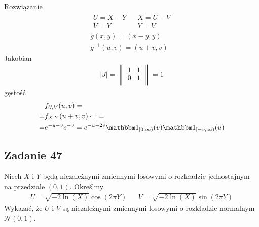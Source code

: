 Rozwiązanie
\begin{gather*}
\begin{array}{lll}
	U=X-Y &  & X=U+V \\
	V=Y   &  & Y=V
\end{array}\\
g(x,y)=(x-y,y)\\
g^{-1}(u,v)=(u+v,v)
\end{gather*}
Jakobian
\begin{gather*}
|J|=
\begin{Vmatrix}
 1 & 1 \\
 0 & 1 \\
\end{Vmatrix}=1
\end{gather*}
gęstość
\begin{align*}
&f_{U,V}(u,v)
=\\=&
f_{X,Y}(u+v,v)\cdot 1
=\\=&
e^{-u-v}e^{-v}=
e^{-u-2v}\mathbbm1_{[0,\infty )}(v)\mathbbm1_{[-v,\infty )}(u)
\end{align*}


\subsection*{Zadanie 47}
Niech $ X $ i $ Y $ będą niezależnymi zmiennymi losowymi o rozkładzie jednostajnym na przedziale $ (0,1) $. Określmy
\begin{align*}
U=\sqrt{-2\ln(X)}\cos(2\pi Y)
&&
V=\sqrt{-2\ln(X)}\sin(2\pi Y)
\end{align*}
Wykazać, że $ U $ i $ V $ są niezależnymi zmiennymi losowymi o rozkładzie normalnym $ \mathcal N(0,1) $.


